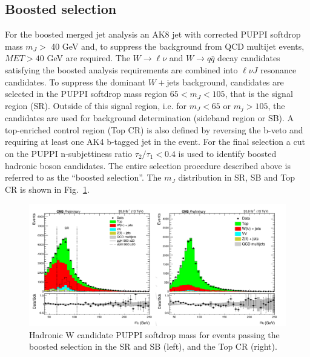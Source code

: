 \subsection*{Boosted selection}
For the boosted merged jet analysis an AK8 jet with corrected PUPPI softdrop mass $m_J >$ 40 GeV and,
to suppress the background from QCD multijet events, $MET>40$ GeV are required.
The $W \to \ell \nu$ and $W \to q \bar{q}$ decay candidates satisfying the boosted analysis requirements are combined into $\ell \nu J$ resonance candidates.
To suppress the dominant $W+$jets background, candidates are selected in the PUPPI softdrop mass region  $65<m_J < 105$, that is the signal region (SR).
Outside of this signal region, i.e. for  $m_J < 65$ or $m_j > 105$, the candidates are used for background determination (sideband region or SB).
A top-enriched control region (Top CR) is also defined by reversing the b-veto and requiring at least one AK4
b-tagged jet in the event.
For the final selection a cut on the PUPPI n-subjettiness ratio $\tau_2 /\tau_1<0.4$ is used to identify boosted
hadronic boson candidates. The entire selection procedure described above is referred to as the ``boosted selection''.
The $m_J$ distribution in SR, SB and Top CR is shown in Fig.~\ref{mJ}.
\begin{figure}
\centering
\includegraphics[scale= 0.8]{../Cap5/mJ}
\caption{Hadronic W candidate PUPPI softdrop mass for events passing
the boosted selection in the SR and SB (left), and the Top CR (right).}
\label{mJ}
\end{figure}

